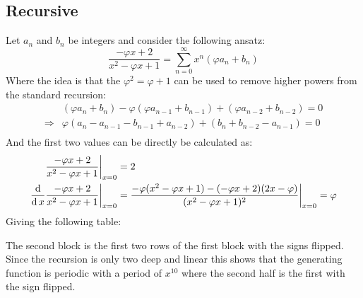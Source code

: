 \subsection{Recursive}
Let $a_n$ and $b_n$ be integers and consider the following ansatz:
\[\frac{-\varphi x+2}{x^2-\varphi x+1} = \sum_{n=0}^\infty x^n(\varphi a_n+b_n)\]
Where the idea is that the $\varphi^2=\varphi+1$ can be used to remove higher powers from the standard recursion:
\[\begin{aligned}
	&(\varphi a_n+b_n)-\varphi(\varphi a_{n-1}+b_{n-1})+(\varphi a_{n-2} + b_{n-2}) = 0\\
	\Rightarrow&\varphi(a_n-a_{n-1}-b_{n-1}+a_{n-2})+(b_n+b_{n-2}-a_{n-1})=0\\
\end{aligned}\]
And the first two values can be directly be calculated as:
\[\begin{aligned}
	\frac{-\varphi x+2}{x^2-\varphi x+1}\bigg|_{x=0}& = 2\\
	\frac{\operatorname{\mathrm{d}}}{\operatorname{\mathrm{d}} x}\frac{-\varphi x+2}{x^2-\varphi x+1}\bigg|_{x=0}& = \frac{-\varphi(x^2-\varphi x+1)-(-\varphi x+2)(2x-\varphi)}{(x^2-\varphi x+1)^2}\bigg|_{x=0} = \varphi\\
\end{aligned}\]
Giving the following table:
\begin{center}
\end{center}
The second block is the first two rows of the first block with the signs flipped.
Since the recursion is only two deep and linear this shows that the generating function is periodic with a period of $x^{10}$ where the second half is the first with the sign flipped.
\\


